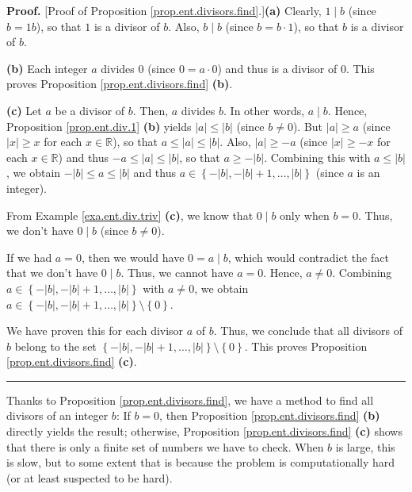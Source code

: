 \documentclass[numbers=enddot,12pt,final,onecolumn,notitlepage]{scrartcl}%
\numberwithin{exer}{subsection}
\theoremstyle{definition}
\newenvironment{proof}[1][Proof]{\noindent\textbf{#1.} }{\ \rule{0.5em}{0.5em}}
\begin{document}
\begin{proof}
[Proof of Proposition \ref{prop.ent.divisors.find}.]\textbf{(a)} Clearly,
$1\mid b$ (since $b=1b$), so that $1$ is a divisor of $b$. Also, $b\mid b$
(since $b=b\cdot1$), so that $b$ is a divisor of $b$.

\textbf{(b)} Each integer $a$ divides $0$ (since $0=a\cdot0$) and thus is a
divisor of $0$. This proves Proposition \ref{prop.ent.divisors.find}
\textbf{(b)}.

\textbf{(c)} Let $a$ be a divisor of $b$. Then, $a$ divides $b$. In other
words, $a\mid b$. Hence, Proposition \ref{prop.ent.div.1} \textbf{(b)} yields
$\left\vert a\right\vert \leq\left\vert b\right\vert $ (since $b\neq0$). But
$\left\vert a\right\vert \geq a$ (since $\left\vert x\right\vert \geq x$ for
each $x\in\mathbb{R}$), so that $a\leq\left\vert a\right\vert \leq\left\vert
b\right\vert $. Also, $\left\vert a\right\vert \geq-a$ (since $\left\vert
x\right\vert \geq-x$ for each $x\in\mathbb{R}$) and thus $-a\leq\left\vert
a\right\vert \leq\left\vert b\right\vert $, so that $a\geq-\left\vert
b\right\vert $. Combining this with $a\leq\left\vert b\right\vert $, we obtain
$-\left\vert b\right\vert \leq a\leq\left\vert b\right\vert $ and thus
$a\in\left\{  -\left\vert b\right\vert ,-\left\vert b\right\vert
+1,\ldots,\left\vert b\right\vert \right\}  $ (since $a$ is an integer).

From Example \ref{exa.ent.div.triv} \textbf{(c)}, we know that $0\mid b$ only
when $b=0$. Thus, we don't have $0\mid b$ (since $b\neq0$).

If we had $a=0$, then we would have $0=a\mid b$, which would contradict the
fact that we don't have $0\mid b$. Thus, we cannot have $a=0$. Hence, $a\neq
0$. Combining $a\in\left\{  -\left\vert b\right\vert ,-\left\vert b\right\vert
+1,\ldots,\left\vert b\right\vert \right\}  $ with $a\neq0$, we obtain
$a\in\left\{  -\left\vert b\right\vert ,-\left\vert b\right\vert
+1,\ldots,\left\vert b\right\vert \right\}  \setminus\left\{  0\right\}  $.

We have proven this for each divisor $a$ of $b$. Thus, we conclude that all
divisors of $b$ belong to the set $\left\{  -\left\vert b\right\vert
,-\left\vert b\right\vert +1,\ldots,\left\vert b\right\vert \right\}
\setminus\left\{  0\right\}  $. This proves Proposition
\ref{prop.ent.divisors.find} \textbf{(c)}.
\end{proof}

Thanks to Proposition \ref{prop.ent.divisors.find}, we have a method to find
all divisors of an integer $b$: If $b=0$, then Proposition
\ref{prop.ent.divisors.find} \textbf{(b)} directly yields the result;
otherwise, Proposition \ref{prop.ent.divisors.find} \textbf{(c)} shows that
there is only a finite set of numbers we have to check. When $b$ is large,
this is slow, but to some extent that is because the problem is
computationally hard (or at least suspected to be hard).
\end{document}
